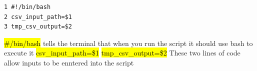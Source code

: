 \documentclass[]{article}
\begin{document}
\begin{tcolorbox}[colback=white, colframe=black, boxrule=0.5pt, arc=2mm, 
    title=First part of the code, width=6.7in, fonttitle=\bfseries, listing only, listing options={language=sh, basicstyle=\ttfamily}]

    \begin{verbatim}
1 #!/bin/bash
2 csv_input_path=$1
3 tmp_csv_output=$2
    \end{verbatim}
\hl{\#\!/bin/bash}\newline
tells the terminal that when you run the script it should use bash to execute it\newline
\hl{csv\_input\_path=\$1}\newline
\hl{tmp\_csv\_output=\$2}\newline
These two lines of code allow inputs to be enntered into the script
\end{tcolorbox}
\end{document}
